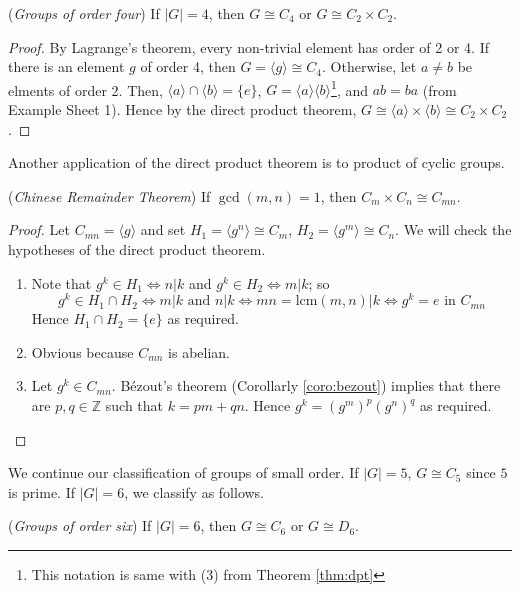 \documentclass[10pt, a4paper, twoside]{report}
\begin{document}
\begin{lemma}
    (\emph{Groups of order four}) If \(|G|=4\), then \(G\cong C_4\) or \(G\cong C_2\times C_2\).
\end{lemma}
\begin{proof}
    By Lagrange's theorem, every non-trivial element has order of 2 or 4. If there is an element \(g\) of order 4, then \(G=\langle g\rangle\cong C_4\). Otherwise, let \(a\neq b\) be elments of order 2. Then, \(\langle a\rangle\cap\langle b\rangle=\{e\}\), \(G=\langle a\rangle\langle b\rangle\)\footnote{This notation is same with (3) from Theorem \ref{thm:dpt}}, and \(ab=ba\) (from Example Sheet 1). Hence by the direct product theorem, \(G\cong\langle a\rangle\times\langle b\rangle\cong C_2\times C_2\).
\end{proof}
Another application of the direct product theorem is to product of cyclic groups.
\begin{theorem}
    (\emph{Chinese Remainder Theorem}) If \(\gcd(m,n)=1\), then \(C_m\times C_n\cong C_{mn}\).
    \label{thm:crt_group}
\end{theorem}
\begin{proof}
    Let \(C_{mn}=\langle g\rangle\) and set \(H_1=\langle g^n\rangle\cong C_m\), \(H_2=\langle g^m\rangle\cong C_n\). We will check the hypotheses of the direct product theorem.
    \begin{enumerate}
        \item Note that \(g^k\in H_1\Leftrightarrow n|k\) and \(g^k\in H_2\Leftrightarrow m|k\); so 
        \[g^k\in H_1\cap H_2\Leftrightarrow m|k\text{  and  }n|k\Leftrightarrow mn=\mathrm{lcm}(m,n)|k\Leftrightarrow g^k=e\text{  in }C_{mn}\]
        Hence \(H_1\cap H_2=\{e\}\) as required.
        \item Obvious because \(C_{mn}\) is abelian.
        \item Let \(g^k\in C_{mn}\). Bézout's theorem (Corollarly \ref{coro:bezout}) implies that there are \(p,q\in \mathbb{Z}\) such that \(k=pm+qn\). Hence \(g^k=(g^m)^p(g^n)^q\) as required.
    \end{enumerate}
\end{proof}
We continue our classification of groups of small order. If \(|G|=5\), \(G\cong C_5\) since \(5\) is prime. If \(|G|=6\), we classify as follows.
\begin{lemma}
    (\emph{Groups of order six}) If \(|G|=6\), then \(G\cong C_6\) or \(G\cong D_6\).
\end{lemma}
\end{document}
